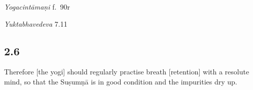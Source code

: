 \begin{ekdosis}
\begin{testimonia}[hp02_005]
\emph{Yogacintāmaṇi} f.~90r

\begin{versinnote}
\end{versinnote}

\emph{Yuktabhavedeva} 7.11
\begin{versinnote}
\end{versinnote}

\end{testimonia}




\subsection*{2.6}
\begin{translation}[hp02_006]
Therefore [the yogi] should regularly practise breath [retention] with a resolute mind, so that the Suṣumṇā is in good condition and the impurities dry up.%
\end{translation}


\end{ekdosis}
